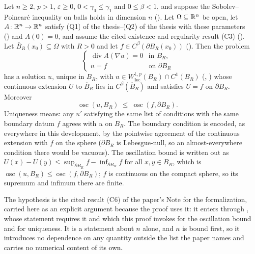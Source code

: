 \begin{lemma}[Lemma 3.1]
Let $n\ge2$, $p>1$, $\varepsilon\ge0$, $0<\gamma_0\le\gamma_1$ and
$0\le\beta<1$, and suppose the Sobolev--Poincar\'e inequality on balls holds in
dimension $n$ ().  Let $\Omega\subseteq\mathbb{R}^n$
be open, let
$A\colon\mathbb{R}^n\to\mathbb{R}^n$ satisfy (Q1) of the thesis--(Q2) of the thesis with these parameters
() and $A(0)=0$, and assume the cited existence
and regularity result (C3) ().  Let
$\overline B_R(x_0)\subseteq\Omega$ with $R>0$ and let
$f\in C^\beta(\partial B_R(x_0))$ ().  Then the problem
\[
\begin{cases}
\operatorname{div}A(\nabla u)=0 & \text{in }B_R,\\
u=f & \text{on }\partial B_R
\end{cases}
\]
has a solution $u$, unique in $B_R$, with
$u\in W^{1,p}_{\mathrm{loc}}(B_R)\cap C^1(B_R)$
(, ) whose continuous extension
$U$ to $\overline B_R$ lies in $C^\beta(\overline B_R)$ and satisfies $U=f$ on
$\partial B_R$.  Moreover
\[
\operatorname*{osc}(u,B_R)\;\le\;\operatorname*{osc}(f,\partial B_R).
\]
Uniqueness means: any $u'$ satisfying the same list of conditions with the same
boundary datum $f$ agrees with $u$ on $B_R$.  The boundary condition is encoded,
as everywhere in this development, by the pointwise agreement of the continuous
extension with $f$ on the sphere ($\partial B_R$ is Lebesgue-null, so an
almost-everywhere condition there would be vacuous).  The oscillation bound is
written out as
$U(x)-U(y)\le\sup_{\partial B_R}f-\inf_{\partial B_R}f$ for all
$x,y\in B_R$, which is $\operatorname*{osc}(u,B_R)\le\operatorname*{osc}(f,\partial B_R)$;
$f$ is continuous on the compact sphere, so its supremum and infimum there are
finite.

The hypothesis  is the cited result (C6) of the
paper's Note for the formalization, carried here as an explicit argument because
the proof uses it: it enters through , whose
statement requires it and which this proof invokes for the oscillation bound and
for uniqueness.  It is a statement about $n$ alone, and $n$ is bound first, so it
introduces no dependence on any quantity outside the list the paper names and
carries no numerical content of its own.
\end{lemma}
